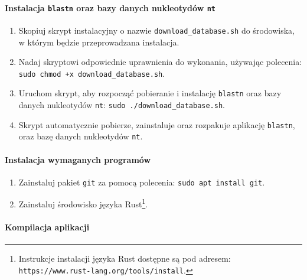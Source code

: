             \paragraph{Instalacja \texttt{blastn} oraz bazy danych nukleotydów \texttt{nt}}

                \begin{enumerate}
                    \item {
                        Skopiuj skrypt instalacyjny o nazwie \texttt{download\_database.sh} do środowiska, w którym będzie przeprowadzana instalacja.
                    }
                    \item {
                        Nadaj skryptowi odpowiednie uprawnienia do wykonania, używając polecenia: \texttt{sudo chmod +x download\_database.sh}.
                    }
                    \item {
                        Uruchom skrypt, aby rozpocząć pobieranie i instalację \texttt{blastn} oraz bazy danych nukleotydów \texttt{nt}: \texttt{sudo ./download\_database.sh}.
                    }
                    \item {
                        Skrypt automatycznie pobierze, zainstaluje oraz rozpakuje aplikację \texttt{blastn}, oraz bazę danych nukleotydów \texttt{nt}.
                    }
                \end{enumerate}

            \paragraph{Instalacja wymaganych programów}

                \begin{enumerate}
                    \item {
                        Zainstaluj pakiet \texttt{git} za pomocą polecenia: \texttt{sudo apt install git}.
                    }
                    \item {
                        Zainstaluj środowisko języka Rust\footnote{Instrukcje instalacji języka Rust dostępne są pod adresem: \texttt{https://www.rust-lang.org/tools/install}.}.
                    }
                \end{enumerate}

            \paragraph{Kompilacja aplikacji}
                
